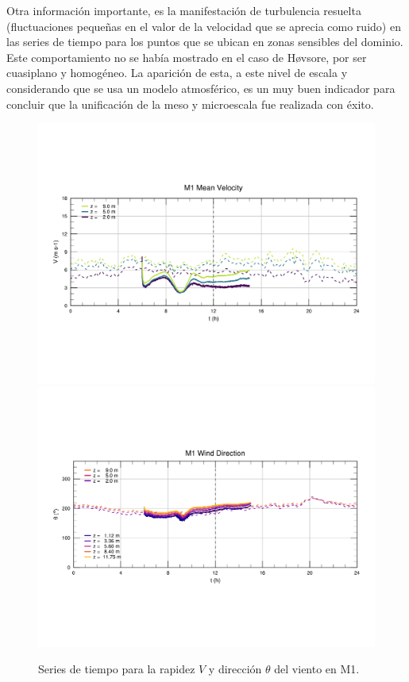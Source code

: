 Otra información importante, es la manifestación de turbulencia resuelta (fluctuaciones pequeñas en el valor de la velocidad que se aprecia como ruido) en las series de tiempo para los puntos que se ubican en zonas sensibles del dominio. Este comportamiento no se había mostrado en el caso de Høvsore, por ser cuasiplano y homogéneo. La aparición de esta, a este nivel de escala y considerando que se usa un modelo atmosférico, es un muy buen indicador para concluir que la unificación de la meso y microescala fue realizada con éxito.

\newpage
\vspace*{\fill}
\begin{figure}[H]
	\centering
	\includegraphics[width=0.87\linewidth,page=1,trim={9mm 57mm 10mm 60mm},clip]{Imagenes/06/bol/ts_interpol_compare.pdf}\\%
	\includegraphics[width=0.87\linewidth,page=1,trim={12mm 52mm 10mm 60mm},clip]{Imagenes/06/bol/ts_interpol_compare_o.pdf}%
	\vspace{-2mm}\caption{Series de tiempo para la rapidez $V$ y dirección $\theta$ del viento en M1.}
	\label{fig:06_bol_ts_m1}
\end{figure}
